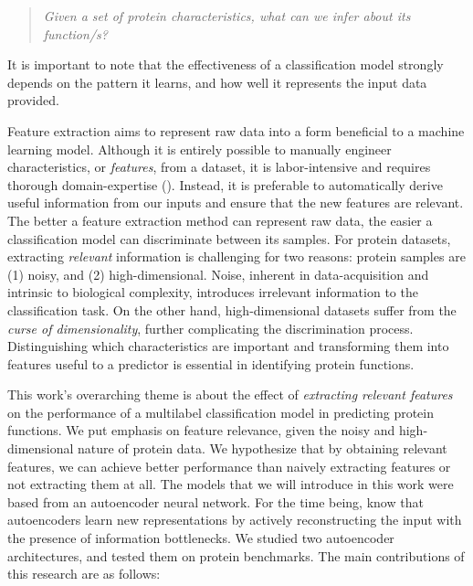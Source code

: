 \begin{quote}
    \itshape
    \small
    Given a set of protein characteristics, what can we infer about
    its function/s?
\end{quote}

\noindent It is important to note that the effectiveness of a classification
model strongly depends on the pattern it learns, and how well it represents
the input data provided.

\par Feature extraction aims to represent raw data into a form beneficial to
a machine learning model. Although it is entirely possible to manually
engineer characteristics, or \textit{features}, from a dataset, it is
labor-intensive and requires thorough domain-expertise
(\cite{bengio2013representation}). Instead, it is preferable to automatically
derive useful information from our inputs and ensure that the new features
are relevant. The better a feature extraction method can represent raw data,
the easier a classification model can discriminate between its samples. For
protein datasets, extracting \textit{relevant} information is challenging for
two reasons: protein samples are (1) noisy, and (2) high-dimensional. Noise,
inherent in data-acquisition and intrinsic to biological complexity,
introduces irrelevant information to the classification task. On the other
hand, high-dimensional datasets suffer from the \textit{curse of
dimensionality}, further complicating the discrimination process.
Distinguishing which characteristics are important and transforming them into
features useful to a predictor is essential in identifying protein functions.

\newpage

\par This work's overarching theme is about the effect of \textit{extracting
relevant features} on the performance of a multilabel classification model in
predicting protein functions. We put emphasis on feature relevance, given the
noisy and high-dimensional nature of protein data. We hypothesize that by
obtaining relevant features, we can achieve better performance than naively
extracting features or not extracting them at all. The models that we will
introduce in this work were based from an autoencoder neural network. For the
time being, know that autoencoders learn new representations by actively
reconstructing the input with the presence of information bottlenecks. We
studied two autoencoder architectures, and tested them on protein benchmarks.
The main contributions of this research are as follows:

